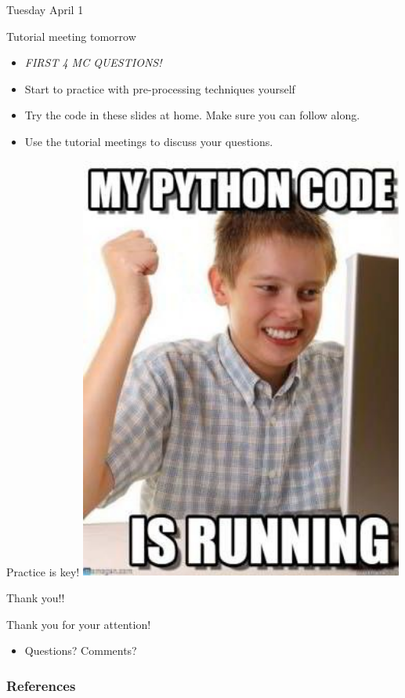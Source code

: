 \documentclass[handout]{beamer}
\begin{document}


\begin{frame}{Tuesday April 1}
	\begin{block}{Tutorial meeting tomorrow}
		\begin{itemize}
                \item \emph{FIRST 4 MC QUESTIONS!}
			\item Start to practice with pre-processing techniques yourself
			\item Try the code in these slides at home. Make sure you can follow along.
			\item Use the tutorial meetings to discuss your questions.
		\end{itemize}
	\end{block}
\end{frame}

\begin{frame}{Practice is key!}
    \centering
    \includegraphics[width=0.8\textwidth,height=0.8\textheight,keepaspectratio]{python_running.jpeg}
\end{frame}


\begin{frame}{Thank you!!}
	\begin{block}{Thank you for your attention!}
		\begin{itemize}
			\item Questions? Comments?
		\end{itemize}
	\end{block}
\end{frame}

\begin{frame}[t,allowframebreaks]
	\frametitle{References}
	\printbibliography
\end{frame}
\end{document}
